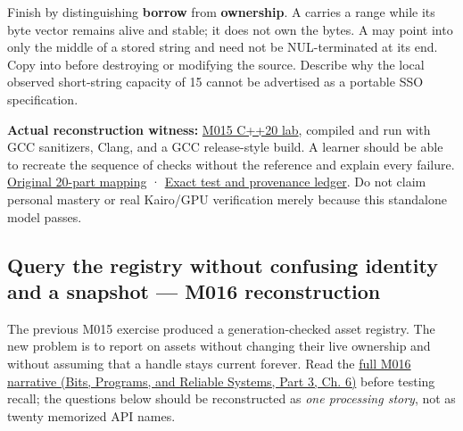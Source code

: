 Finish by distinguishing \textbf{borrow} from \textbf{ownership}. A  carries a range while its byte vector remains alive and stable; it does not own the bytes. A  may point into only the middle of a stored string and need not be NUL-terminated at its end. Copy  into  before destroying or modifying the source. Describe why the local observed short-string capacity of 15 cannot be advertised as a portable SSO specification.

\textbf{Actual reconstruction witness:} \hyperref[source-file-e829cf731b17419e282775cf]{M015 C++20 lab}, compiled and run with GCC sanitizers, Clang, and a GCC release-style build. A learner should be able to recreate the sequence of checks without the reference and explain every failure. \hyperref[appendix-fd090d982a15-m015-parts-231250-growing-the-asset-registry-without-losing-identities]{Original 20-part mapping} · \hyperref[appendix-a103e7846d21-phase-5-additive-reconstruction-m015-parts-231250]{Exact test and provenance ledger}. Do not claim personal mastery or real Kairo/GPU verification merely because this standalone model passes.

\subsection{Query the registry without confusing identity and a snapshot --- M016 reconstruction}\label{appendix-960160274237-query-the-registry-without-confusing-identity-and-a-snapshot-m016-reconstruction}

\hypertarget{appendix-960160274237-query-the-registry-without-confusing-identity-and-a-snapshot-m016-reconstruction}{}

The previous M015 exercise produced a generation-checked asset registry. The new problem is to report on assets without changing their live ownership and without assuming that a handle stays current forever. Read the \href{../01-Bits-Programs-and-Reliable-Systems-P03/main.pdf\#01-foundations-i-ch006-from-a-living-asset-registry-to-reliable-queries-and-transformations}{full M016 narrative (Bits, Programs, and Reliable Systems, Part 3, Ch. 6)} before testing recall; the questions below should be reconstructed as \emph{one processing story}, not as twenty memorized API names.

